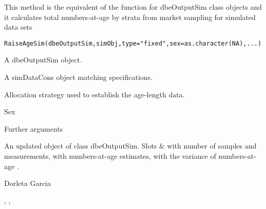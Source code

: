 \begin{Description}\relax
This method is the equivalent of the function  for dbeOutputSim class objects 
and it calculates total numbers-at-age by strata from market sampling for simulated data sets
\end{Description}
\begin{Usage}
\begin{verbatim}
RaiseAgeSim(dbeOutputSim,simObj,type="fixed",sex=as.character(NA),...)
\end{verbatim}
\end{Usage}
\begin{Arguments}
\begin{ldescription}
\item[\code{dbeOutputSim}] A dbeOutputSim object.
\item[\code{simObj}] A simDataCons object matching  specifications.
\item[\code{type}] Allocation strategy used to establish the age-length data.
\item[\code{sex}] Sex
\item[\code{...}] Further arguments
\end{ldescription}
\end{Arguments}
\begin{Value}
An updated object of class dbeOutputSim.
Slots  \&  with number of samples and measurements,
 with numbers-at-age estimates,
 with the variance of numbers-at-age .
\end{Value}
\begin{Author}\relax
Dorleta Garcia 
\end{Author}
\begin{SeeAlso}\relax
{}, , 
\end{SeeAlso}

